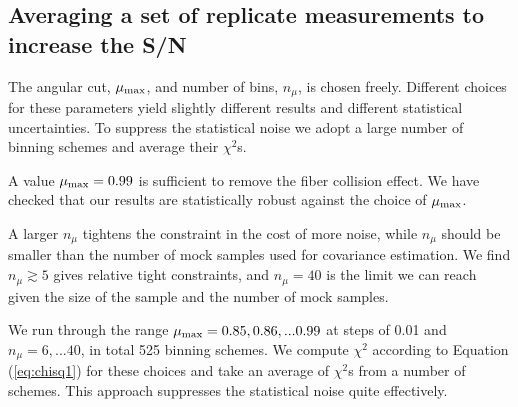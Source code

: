 \documentclass[iop]{emulateapj}
\begin{document}
\subsection{Averaging a set of replicate measurements to increase the S/N}\label{sec:binningscheme}

The angular cut, $\mu_{\rm max}$, and number of bins, $n_\mu$, is chosen freely.
Different choices for these parameters yield slightly different results and different statistical uncertainties.
To suppress the statistical noise we adopt a large number of binning schemes and average their $\chi^2$s.

A value $\mu_{\rm max} = 0.99$ is sufficient to remove the fiber collision effect.
We have checked that our results are statistically robust against the choice of $\mu_{\rm max}$.

A larger $n_\mu$ tightens the constraint 
in the cost of more noise, 
while $n_\mu$ should be smaller than the number of mock samples used for covariance estimation.
We find $n_\mu \gtrsim 5$ gives relative tight constraints, 
and $n_\mu = 40$ is the limit we can reach given the size of the sample and the number of mock samples.

We run through the range $\mu_{\rm max} = 0.85, 0.86, ... 0.99$ at steps of 0.01 and $n_\mu =  6, ... 40$, in total 525 binning schemes.
We compute $\chi^2$ according to Equation (\ref{eq:chisq1}) for these choices and take an average of $\chi^2$s from a number of schemes.
This approach suppresses the statistical noise quite effectively. %

\end{document}
